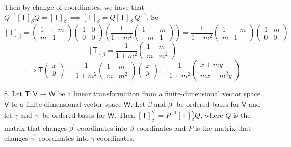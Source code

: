 \documentclass[11pt]{article}
\newcommand{\br}[1]{\left(#1\right)}
\newcommand{\sbr}[1]{\left[#1\right]}
\begin{document}
Then by change of coordinates, we have that $Q^{-1}\sbr{\mathsf{T}}_{\beta}Q = \sbr{\mathsf{T}}_{\beta^{\prime}} \implies \sbr{\mathsf{T}}_{\beta} = Q\sbr{\mathsf{T}}_{\beta^{\prime}}Q^{-1}$. So $$\sbr{\mathsf{T}}_{\beta} = \begin{pmatrix}
    1 & -m \\
    m & 1
\end{pmatrix} \begin{pmatrix}
    1 & 0 \\
    0 & 0
\end{pmatrix} \br{\frac{1}{1+m^2}\begin{pmatrix}
    1 & m \\
    -m & 1
\end{pmatrix}} = \frac{1}{1+m^2}\begin{pmatrix}
    1 & -m \\
    m & 1
\end{pmatrix} \begin{pmatrix}
    1 & m \\
    0 & 0
\end{pmatrix}$$
$$\sbr{\mathsf{T}}_{\beta} = \frac{1}{1+m^2}\begin{pmatrix}
    1 & m \\
    m & m^2
\end{pmatrix}$$
$$\implies \mathsf{T} \begin{pmatrix}
    x \\ y
\end{pmatrix} = \frac{1}{1+m^2}\begin{pmatrix}
    1 & m \\
    m & m^2
\end{pmatrix}\begin{pmatrix}
    x \\ y
\end{pmatrix} = \frac{1}{1+m^2}\begin{pmatrix}
    x+my \\ mx+m^2y 
\end{pmatrix}$$

8. Let $\mathsf{T} : \mathsf{V} \to \mathsf{W}$ be a linear transformation from a finite-dimensional vector space $\mathsf{V}$ to a finite-dimensional vector space $\mathsf{W}$. Let $\beta$ and $\beta^{\prime}$ be ordered bases for $\mathsf{V}$ and let $\gamma$ and $\gamma^{\prime}$ be ordered bases for $\mathsf{W}$. Then $\sbr{\mathsf{T}}_{\beta^{\prime}}^{\gamma^{\prime}} = P^{-1}\sbr{\mathsf{T}}_{\beta}^{\gamma}Q$, where $Q$ is the matrix that changes $\beta^{\prime}$-coordinates into $\beta$-coordinates and $P$ is the matrix that changes $\gamma^{\prime}$-coordinates into $\gamma$-coordinates.
\end{document}
